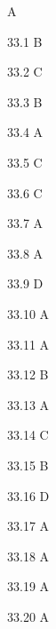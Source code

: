\begin{Solution}{33}
A
\end{Solution}
\begin{Solution}{33.{1}}
B
\end{Solution}
\begin{Solution}{33.{2}}
C
\end{Solution}
\begin{Solution}{33.{3}}
B
\end{Solution}
\begin{Solution}{33.{4}}
A
\end{Solution}
\begin{Solution}{33.{5}}
C
\end{Solution}
\begin{Solution}{33.{6}}
C
\end{Solution}
\begin{Solution}{33.{7}}
A
\end{Solution}
\begin{Solution}{33.{8}}
A
\end{Solution}
\begin{Solution}{33.{9}}
D
\end{Solution}
\begin{Solution}{33.{10}}
A
\end{Solution}
\begin{Solution}{33.{11}}
A
\end{Solution}
\begin{Solution}{33.{12}}
B
\end{Solution}
\begin{Solution}{33.{13}}
A
\end{Solution}
\begin{Solution}{33.{14}}
C
\end{Solution}
\begin{Solution}{33.{15}}
B
\end{Solution}
\begin{Solution}{33.{16}}
D
\end{Solution}
\begin{Solution}{33.{17}}
A
\end{Solution}
\begin{Solution}{33.{18}}
A
\end{Solution}
\begin{Solution}{33.{19}}
A
\end{Solution}
\begin{Solution}{33.{20}}
A
\end{Solution}
